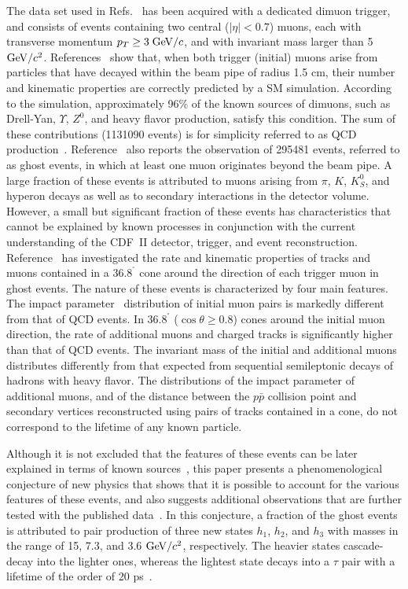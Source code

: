 \documentclass[twocolumn,10pt,prl,preprint,floatfix,nofootinbib,superscriptaddress,showpacs,amssymb]{revtex4}
\def\deg{^\circ}
\begin{document}
 The data set used in Refs.~\cite{bbxs,a0disc} has been acquired with a 
 dedicated dimuon trigger, and consists of events containing two central
 ($|\eta|<0.7$) muons, each with transverse momentum $p_T \geq 3 \; {\rm GeV/}c$,
 and with invariant mass larger than 5 ${\rm GeV/}c^2$. References~\cite{bbxs,a0disc}
 show that, when both trigger (initial) muons arise from particles
 that have decayed within the beam pipe of radius 1.5 cm, their number and
 kinematic properties  are
 correctly predicted by a SM simulation. According to the simulation, 
 approximately 96\% of the known sources of dimuons, such as Drell-Yan,
 $\Upsilon$, $Z^0$, and heavy flavor production, satisfy this condition.
 The sum of these contributions (1131090 events) is 
 for simplicity referred to as QCD production~\cite{a0disc}.
 Reference~\cite{a0disc} also reports the observation of
 295481 events, referred to as ghost events,
 in which at least one muon originates beyond the beam pipe.
 A large fraction of these events 
 is attributed to muons arising from $\pi$, $K$, $K^0_S$, and hyperon
 decays as well as to secondary interactions in the detector volume. 
 However, a small but significant fraction of these events has characteristics
 that cannot be explained by known processes in conjunction with the
 current understanding of the CDF~II detector, trigger, and event
 reconstruction. Reference~\cite{a0disc} has investigated the rate and kinematic
 properties of tracks and muons contained in a $36.8^{\deg}$ cone around the
 direction of each trigger muon in ghost events.
 The nature of these events is characterized
 by four main features. The impact parameter~\cite{ip} distribution of 
 initial muon pairs is markedly different from that of QCD events.
 In $36.8^{\deg}$ ($\cos \theta \geq 0.8$) cones around the initial muon direction,
 the rate of additional muons and charged tracks is significantly higher than that
 of QCD events. The invariant mass of the initial and additional muons
 distributes differently from that expected from sequential semileptonic decays
 of hadrons with heavy flavor. The distributions of the
 impact parameter of additional muons, and of the distance
 between the $p\bar{p}$ collision point and
 secondary vertices reconstructed using  pairs of tracks
 contained in a cone,
 do not correspond to the lifetime of any known particle.

 Although it is not excluded that the features of these events can be
 later explained in terms of known sources~\cite{a0disc},
 this paper presents a phenomenological conjecture of new 
 physics that shows that it is possible to account for the various features
 of these events, and also suggests additional observations that are further
 tested with the published data~\cite{a0disc}. In this conjecture, a fraction of the ghost
 events is attributed to pair production of three new states $h_1$, $h_2$,
 and $h_3$ with masses in the range of 15, 7.3, and 3.6 ${\rm GeV/}c^2$,
 respectively. The heavier states cascade-decay into the lighter ones,
 whereas the lightest state decays into a $\tau$ pair with a lifetime
 of the order of 20 ps~\cite{a0disc}.
\end{document}
